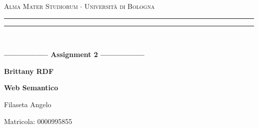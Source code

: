 \begin{titlepage}
    \begin{center}
        {{\Large{\textsc{Alma Mater Studiorum $\cdot$ Università di Bologna}}}}
        \rule[0.1cm]{15.8cm}{0.1mm}
        \rule[0.5cm]{15.8cm}{0.6mm}
        \\
        \vspace{3mm}
    \end{center}
    \vspace{2mm}
    \begin{center}
        {\LARGE{\bf{----------------- Assignment 2 -----------------}}}
        \vspace{5mm} \par \noindent
        {\Huge{\bf{Brittany RDF}}}
        \vspace{10mm} \par \noindent
        {\LARGE \textbf{Web Semantico}}
        \vspace{15mm} \par \noindent
        {\Large Filaseta Angelo}
        \vspace{15mm} \par \noindent
        {\Large Matricola: 0000995855}
    \end{center}
    \hfill
    \vspace{40mm}
\end{titlepage}
